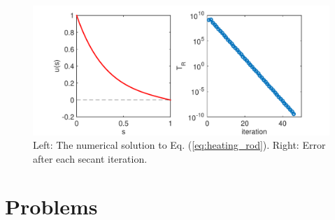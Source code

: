 \begin{figure}
\centering
\includegraphics[width=5in]{06.ode2/heating_rod.pdf}
\caption{Left: The numerical solution to Eq. (\ref{eq:heating_rod}). Right: Error after each secant iteration.}
\label{fig:heating_rod}
\end{figure}





\newpage
\noindent
\section{Problems}

